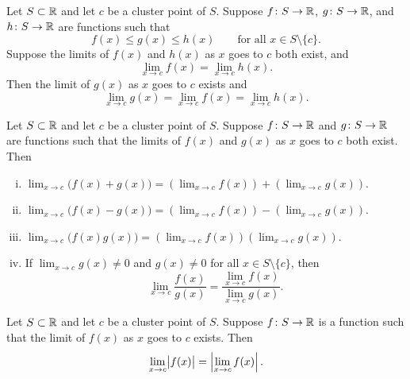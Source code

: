 \begin{cor} \label{fsqueeze:cor}
Let $S \subset {\mathbb{R}}$ and let $c$ be a cluster point of $S$.
Suppose $f \colon S \to {\mathbb{R}}$,
$g \colon S \to {\mathbb{R}}$, and $h \colon S \to {\mathbb{R}}$ are functions such that
\begin{equation*}
f(x) \leq g(x) \leq h(x) \qquad \text{for all } x \in S \setminus \{ c \}.
\end{equation*}
Suppose the limits of $f(x)$ and $h(x)$ as $x$ goes to $c$ both exist, and
\begin{equation*}
\lim_{x\to c} f(x) = \lim_{x\to c} h(x) .
\end{equation*}
Then the limit of $g(x)$ as $x$ goes to $c$ exists and
\begin{equation*}
\lim_{x\to c} g(x) =
\lim_{x\to c} f(x) = \lim_{x\to c} h(x) .
\end{equation*}
\end{cor}

\begin{cor} \label{falg:cor}
Let $S \subset {\mathbb{R}}$ and let $c$ be a cluster point of $S$.  
Suppose $f \colon S \to {\mathbb{R}}$ and
$g \colon S \to {\mathbb{R}}$ are functions
such that 
the limits of $f(x)$ and $g(x)$ as $x$ goes to $c$ both exist.
Then
\begin{enumerate}[(i)]
\item
$\displaystyle
\lim_{x\to c} \bigl(f(x)+g(x)\bigr) = \left(\lim_{x\to c} f(x)\right) + 
\left(\lim_{x\to c} g(x)\right) .
$
\item
$\displaystyle
\lim_{x\to c} \bigl(f(x)-g(x)\bigr) = \left(\lim_{x\to c} f(x)\right) -
\left(\lim_{x\to c} g(x)\right) .
$
\item
$\displaystyle
\lim_{x\to c} \bigl(f(x)g(x)\bigr) = \left(\lim_{x\to c} f(x)\right)
\left(\lim_{x\to c} g(x)\right) .
$
\item \label{falg:cor:iv} If
$\displaystyle \lim_{x\to c} g(x) \neq 0$
and $g(x) \neq 0$ for all $x \in S \setminus \{ c \}$, then
\begin{equation*}
\lim_{x\to c} \frac{f(x)}{g(x)} =
\frac{\lim_{x\to c} f(x)}{\lim_{x\to c} g(x)} .
\end{equation*}
\end{enumerate}
\end{cor}

\begin{cor} \label{fabs:cor}
Let $S \subset {\mathbb{R}}$ and let $c$ be a cluster point of $S$.
Suppose $f \colon S \to {\mathbb{R}}$ is a function such that the limit of $f(x)$ as $x$ goes to $c$
exists.
Then
\begin{equation*}
\lim_{x\to c} \bigl\lvert {f(x)} \bigr\rvert =
\left\lvert {\lim_{x\to c} f(x)} \right\rvert.
\end{equation*}
\end{cor}

